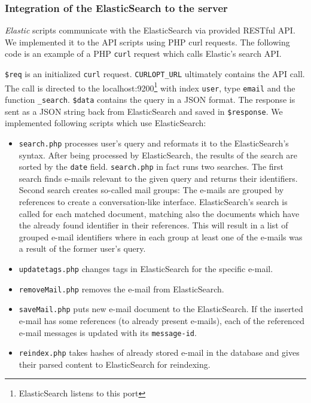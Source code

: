 \subsubsection{Integration of the ElasticSearch to the server}
\emph{Elastic} scripts communicate with the ElasticSearch via provided RESTful API. We implemented it to the API scripts using PHP curl requests.  
The following code is an example of a PHP \texttt{curl} request which calls Elastic's search API.
\pagebreak
{}
\texttt{\$req} is an initialized \texttt{curl} request. \texttt{CURLOPT\_URL} ultimately contains the API call. The call is directed to the localhost:9200\footnote{ElasticSearch listens to this port} with index \texttt{user}, type \texttt{email} and the function \texttt{\_search}. \texttt{\$data} contains the query in a JSON format. The response is sent as a JSON string back from ElasticSearch and saved in \texttt{\$response}.
We implemented following scripts which use ElasticSearch:
\begin{itemize}
\item \texttt{search.php} processes user's query and reformats it to the ElasticSearch's syntax. After being processed by ElasticSearch, the results of the search are sorted by the \texttt{date} field. \texttt{search.php} in fact runs two searches. The first search finds e-mails relevant to the given query and returns their identifiers. Second search creates so-called mail groups:  The e-mails are grouped by references to create a conversation-like interface. ElasticSearch's search is called for each matched document, matching also the documents which have the already found identifier in their references. This will result in a list of grouped e-mail identifiers where in each group at least one of the e-mails was a result of the former user's query.
\item \texttt{updatetags.php} changes tags in ElasticSearch for the specific e-mail.
\item \texttt{removeMail.php} removes the e-mail from ElasticSearch.
\item \texttt{saveMail.php} puts new e-mail document to the ElasticSearch. If the inserted e-mail has some references (to already present e-mails), each of the referenced e-mail messages is updated with its \texttt{message-id}.
\item \texttt{reindex.php} takes hashes of already stored e-mail in the database and gives their parsed content to ElasticSearch for reindexing.
\end{itemize}
 
